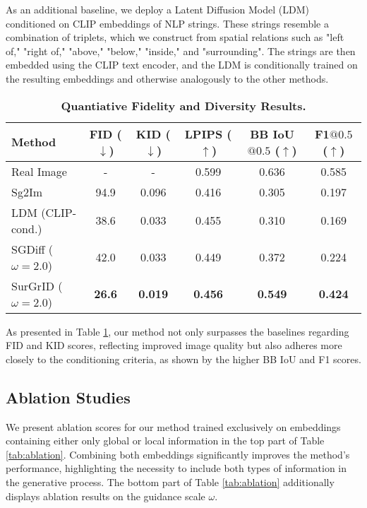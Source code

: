 As an additional baseline, we deploy a Latent Diffusion Model (LDM) \cite{rombach2022high} conditioned on CLIP embeddings \cite{radford2021learning} of NLP strings. These strings resemble a combination of triplets, which we construct from spatial relations such as "left of," "right of," "above," "below," "inside," and "surrounding". The strings are then embedded using the CLIP text encoder, and the LDM is conditionally trained on the resulting embeddings and otherwise analogously to the other methods. 

\begin{table}[htbp]
    \centering
    \caption{\textbf{Quantiative Fidelity and Diversity Results.}}
    \begin{tabular}{l|ccc|cc}
         \textbf{Method} & \textbf{FID} ($\downarrow$) & \textbf{KID} ($\downarrow$) & \textbf{LPIPS} ($\uparrow$) & \textbf{BB IoU$@0.5$} ($\uparrow$) & \textbf{F1$@0.5$} ($\uparrow$)\\
         \hline
         Real Image & - & - & 0.599 & 0.636 & 0.585\\
         \hline
         Sg2Im \cite{johnson2018image} & 94.9 & 0.096 & 0.416 & 0.305 & 0.197\\
         LDM \cite{rombach2022high} (CLIP-cond.) & 38.6 & 0.033 & 0.455 & 0.310 & 0.169\\ 
         SGDiff \cite{yang2022diffusion} ($\omega=2.0$)  & 42.0 &  0.033 &  0.449 & 0.372 & 0.224\\     
         SurGrID ($\omega=2.0$) & \textbf{26.6} & \textbf{0.019} & \textbf{0.456} & \textbf{0.549} & \textbf{0.424}\\
    \end{tabular}
    \label{tab:quan}
\end{table}

As presented in Table \ref{tab:quan}, our method not only surpasses the baselines regarding FID and KID scores, reflecting improved image quality but also adheres more closely to the conditioning criteria, as shown by the higher BB IoU and F1 scores.

\subsection{Ablation Studies}

We present ablation scores for our method trained exclusively on embeddings containing either only global or local information in the top part of Table \ref{tab:ablation}. Combining both embeddings significantly improves the method's performance, highlighting the necessity to include both types of information in the generative process. The bottom part of Table \ref{tab:ablation} additionally displays ablation results on the guidance scale $\omega$.

